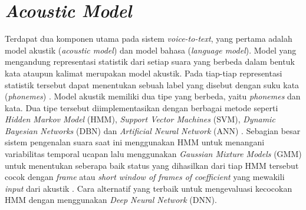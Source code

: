 \section{\textit{Acoustic Model}}
\par Terdapat dua komponen utama pada sistem \textit{voice-to-text}, yang pertama adalah model akustik (\textit{acoustic model}) dan model bahasa (\textit{language model}). Model yang mengandung representasi statistik dari setiap suara yang berbeda dalam bentuk kata ataupun kalimat merupakan model akustik. Pada tiap-tiap representasi statistik tersebut dapat menentukan sebuah label yang disebut dengan suku kata (\textit{phonemes}) \citep{misbullah2020}. Model akustik memiliki dua tipe yang berbeda, yaitu \textit{phonemes} dan kata. Dua tipe tersebut diimplementasikan dengan berbagai metode seperti \textit{Hidden Markov Model} (HMM), \textit{Support Vector Machines} (SVM), \textit{Dynamic Bayesian Networks} (DBN) dan \textit{Artificial Neural Network} (ANN) \citep{gupta2016}. Sebagian besar sistem pengenalan suara saat ini menggunakan HMM untuk menangani variabilitas temporal ucapan lalu menggunakan \textit{Gaussian Mixture Models} (GMM) untuk menentukan seberapa baik status yang dihasilkan dari tiap HMM tersebut cocok dengan \textit{frame} atau \textit{short window of frames of coefficient} yang mewakili \textit{input} dari akustik \citep{hinton2012}. Cara alternatif yang terbaik untuk mengevaluasi kecocokan HMM dengan menggunakan \textit{Deep Neural Network} (DNN).

